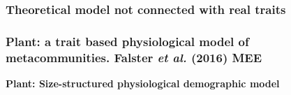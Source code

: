 \documentclass[mathserif,11pt]{beamer}
\begin{document}


\begin{frame}\frametitle{\textbf{Theoretical model not connected with real traits}}
\end{frame}


\begin{frame}\frametitle{\textbf{Plant: a trait based physiological
      model of metacommunities. Falster \textit{et al.} (2016) MEE}}
\end{frame}


\begin{frame}{\textbf{Plant: Size-structured physiological demographic model}}
\end{frame}
\end{document}
